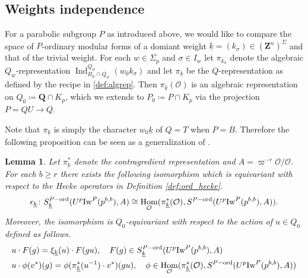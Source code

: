 \documentclass[leqno]{amsart}
\newtheorem{lem}[thm]{Lemma}
\theoremstyle{definition}
\theoremstyle{remark}
\newcommand{\oo}{\mathcal{O}}
\newcommand{\Q}{{\mathbf{Q}}}
\newcommand{\Z}{{\mathbf{Z}}}
\DeclareMathOperator{\Hom}{Hom}
\DeclareMathOperator{\Ind}{Ind}
\newcommand{\wt}[1]{\underline{ #1 }}
\newcommand{\Iw}{\textnormal{Iw}} %
\newcommand{\ord}{\textnormal{ord}} %
\begin{document}
\subsection{Weights independence}

For a parabolic subgroup $P$ as introduced above,
we would like to compare the space of 
$P$-ordinary modular forms
of a domiant weight 
$\wt{k}=(k_\sigma)\in (\Z^n)^{\Sigma}$
and that of the trivial weight.
For each $w\in\Sigma_p$ and $\sigma\in I_w$
let $\pi_{k_{\sigma}}$ denote 
the algebraic $Q_w$-representation
$\Ind_{B_w\cap Q_w}^{Q_w}(w_0 k_\sigma)$
and let $\pi_{\wt{k}}$ be the $Q$-representation
as defined by the recipe in \eqref{def:algrep}.
Then $\pi_{\wt{k}}(\oo)$ is an algebraic representation on
$Q_0\coloneqq \Q\cap K_p$,
which we extends  to $P_0\coloneqq P\cap K_p$
via the projection $P=QU\to Q$.

Note that $\pi_{\wt{k}}$
is simply the character $w_0\wt{k}$
of $Q=T$ when $P=B$.
Therefore the following proposition can be seen as
a generalization of \cite[Prop 2.22]{ger}.

\begin{lem}
	Let $\pi_{\wt{k}}^*$ denote the contragredient
	representation and $A=\varpi^{-r}\oo/\oo$.
	For each $b\geq r$ there exists 
    the following isomorphism 
    which is equivariant with respect to the Hecke operators
    in Definition \ref{def:ord_hecke}.
	\[
		\epsilon_{\wt{k}} \colon 
		S_{\wt{k}}^{P-\ord}(U^p\Iw^P(p^{b,b}),A)\cong 
		\Hom_{\oo}(\pi_{\wt{k}}^*(\oo),
		S^{P-\ord}(U^p\Iw^P(p^{b,b}),A)).
	\]
	Moreover, the isomorphism is $Q_0$-equivariant 
    with respect to
	the action of $u\in Q_0$ defined as follows.
	\begin{align*}
	&u\cdot F(g)=\xi_{\wt{k}}(u)\cdot F(gu),\quad
	F(g)\in S_{\wt{k}}^{P-\ord}(U^p\Iw^P(p^{b,b}),A)\\
	&u\cdot \phi(v^*)(g)=
	\phi(\pi^*_{\wt{k}}(u^{-1})\cdot v^*)(gu),\quad
	\phi\in \Hom_{\oo}(\pi_{\wt{k}}^*(\oo),
	S^{P-\ord}(U^p\Iw^P(p^{b,b}),A))
	\end{align*}
\end{lem}
\end{document}
